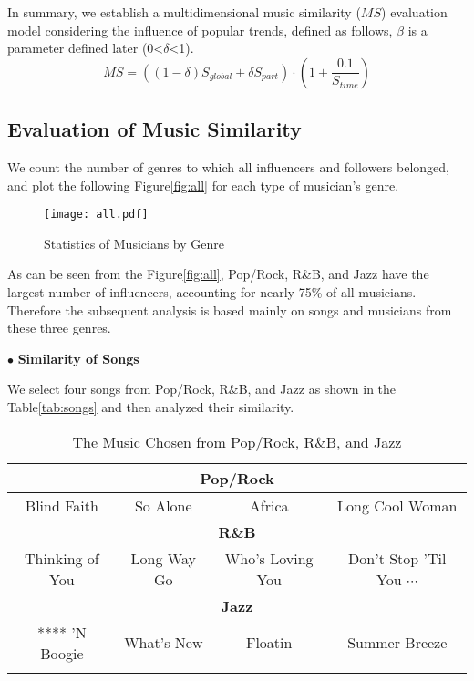\documentclass[12pt]{article}  %
\newenvironment{shrinkeq}[1]
{ \bgroup
	\addtolength\abovedisplayshortskip{#1}
	\addtolength\abovedisplayskip{#1}
	\addtolength\belowdisplayshortskip{#1}
	\addtolength\belowdisplayskip{#1}}
{\egroup\ignorespacesafterend}
\begin{document}
In summary, we establish a multidimensional music similarity ($MS$) evaluation model considering the influence of popular trends, defined as follows, $\beta$ is a parameter defined later (0<$\delta$<1).
\begin{shrinkeq}{-1.5ex}
	\begin{equation}
	MS=((1-\delta) S_{global}+ \delta S_{part})\cdot(1+\frac{0.1}{S_{time}})
	\end{equation}
\end{shrinkeq}
\vspace{-0.9cm}
\subsection{Evaluation of Music Similarity}

We count the number of genres to which all influencers and followers belonged, and plot the following Figure\eqref{fig:all} for each type of musician's genre.

\begin{figure}[htbp]
	\centering
	\texttt{[image: all.pdf]}
	\caption{Statistics of Musicians by Genre}\label{fig:all}
\end{figure}

As can be seen from the Figure\eqref{fig:all}, Pop/Rock, R\&B, and Jazz have the largest number of influencers, accounting for nearly 75\% of all musicians. Therefore the subsequent analysis is based mainly on songs and musicians from these three genres.


$\bullet$ \textbf{Similarity of Songs}

We select four songs from Pop/Rock, R\&B, and Jazz as shown in the Table\eqref{tab:songs} and then analyzed their similarity.

\begin{table}[htbp]
	\centering
	\caption{The Music Chosen from Pop/Rock, R\&B, and Jazz}\label{tab:songs}
	\begin{tabular}{rrrr}
		\hline
		\hline
		\multicolumn{4}{c}{\textbf{Pop/Rock}} \\
		\hline
		\multicolumn{1}{c|}{Blind Faith} & \multicolumn{1}{c|}{So Alone} & \multicolumn{1}{c|}{Africa} & \multicolumn{1}{c}{Long Cool Woman} \\
		\hline\hline
		\multicolumn{4}{c}{\textbf{R\&B}} \\
		\hline
		\multicolumn{1}{c|}{Thinking of You} & \multicolumn{1}{c|}{Long Way Go} & \multicolumn{1}{c|}{Who's Loving You} & \multicolumn{1}{c}{Don't Stop 'Til You $\cdots$} \\
		\hline\hline
		\multicolumn{4}{c}{\textbf{Jazz}} \\
		\hline
		\multicolumn{1}{c|}{**** 'N Boogie} & \multicolumn{1}{c|}{What's New} & \multicolumn{1}{c|}{Floatin} & \multicolumn{1}{c}{Summer Breeze} \\
		\hline
		\hline\\
	\end{tabular}%
\end{table}%
\end{document}
